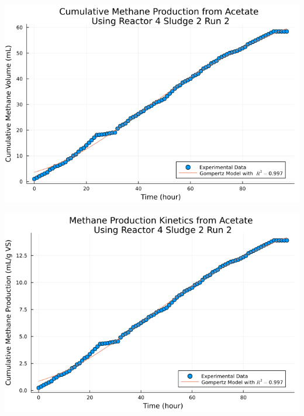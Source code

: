 \documentclass[11pt]{article}
\begin{document}
\begin{center}
\includegraphics[width=.9\linewidth]{../plots/BMPs/Acetate/methane_kinetics_acet_test_4_s2_2_hour.png}
\end{center}

\begin{center}
\includegraphics[width=.9\linewidth]{../plots/BMPs/Acetate/specific_methane_kinetics_acet_test_4_s2_2_hour.png}
\end{center}
\end{document}
